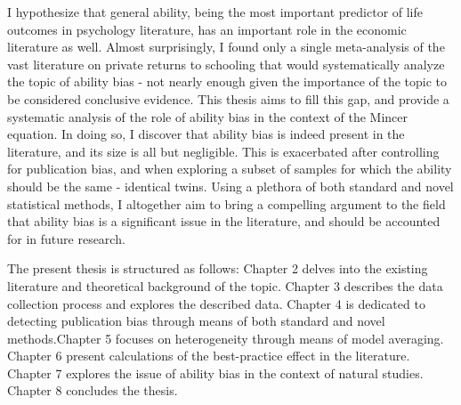 I hypothesize that general ability, being the most important predictor of life outcomes in psychology literature, has an important role in the economic literature as well. Almost surprisingly, I found only a single meta-analysis of the vast literature on private returns to schooling that would systematically analyze the topic of ability bias - not nearly enough given the importance of the topic to be considered conclusive evidence. This thesis aims to fill this gap, and provide a systematic analysis of the role of ability bias in the context of the Mincer equation. In doing so, I discover that ability bias is indeed present in the literature, and its size is all but negligible. This is exacerbated after controlling for publication bias, and when exploring a subset of samples for which the ability should be the same - identical twins. Using a plethora of both standard and novel statistical methods, I altogether aim to bring a compelling argument to the field that ability bias is a significant issue in the literature, and should be accounted for in future research.

The present thesis is structured as follows: Chapter 2 delves into the existing literature and theoretical background of the topic. Chapter 3 describes the data collection process and explores the described data. Chapter 4 is dedicated to detecting publication bias through means of both standard and novel methods.Chapter 5 focuses on heterogeneity through means of model averaging. Chapter 6 present calculations of the best-practice effect in the literature. Chapter 7 explores the issue of ability bias in the context of natural studies. Chapter 8 concludes the thesis.